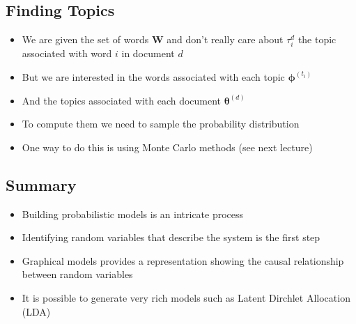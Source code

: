 \begin{slide}
\section{Finding Topics}

\begin{PauseHighLight}
  \begin{itemize}
  \item We are given the set of words $\bm{W}$ and don't really care
    about $\tau_i^d$ the topic associated with word $i$ in document
    $d$\pause
  \item But we are interested in the words associated with each topic
    $\bm{\phi}^{(t_i)}$\pause
  \item And the topics associated with each document
    $\bm{\theta}^{(d)}$\pause
  \item To compute them we need to sample the probability
    distribution\pause
  \item One way to do this is using Monte Carlo methods (see next
    lecture)\pause 
  \end{itemize}
\end{PauseHighLight}

\end{slide}



\begin{slide}
\section{Summary}

\begin{PauseHighLight}
  \begin{itemize}
  \item Building probabilistic models is an intricate process\pause
  \item Identifying random variables that describe the system is the
    first step\pause
  \item Graphical models provides a representation showing the causal
    relationship between random variables\pause
  \item It is possible to generate very rich models such as Latent
    Dirchlet Allocation (LDA)\pause
  \end{itemize}
\end{PauseHighLight}

\end{slide}
